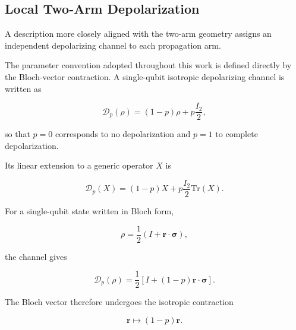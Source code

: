 
\subsection{Local Two-Arm Depolarization}
\label{subsec:local_two_arm_depolarization}

A description more closely aligned with the two-arm geometry assigns an
independent depolarizing channel to each propagation arm.

The parameter convention adopted throughout this work is defined directly by the
Bloch-vector contraction. A single-qubit isotropic depolarizing channel is written as

\begin{equation}
\mathcal{D}_{p}(\rho)
=
(1-p)\rho
+
p\frac{I_2}{2},
\label{eq:single_qubit_depolarizing_density_map}
\end{equation}

so that \(p=0\) corresponds to no depolarization and \(p=1\) to complete
depolarization.

Its linear extension to a generic operator \(X\) is

\begin{equation}
\mathcal{D}_{p}(X)
=
(1-p)X
+
p\frac{I_2}{2}\mathrm{Tr}(X).
\label{eq:single_qubit_depolarizing_operator_map}
\end{equation}

For a single-qubit state written in Bloch form,

\begin{equation}
\rho
=
\frac{1}{2}
\left(
I+\mathbf{r}\cdot\boldsymbol{\sigma}
\right),
\end{equation}

the channel gives

\begin{equation}
\mathcal{D}_p(\rho)
=
\frac{1}{2}
\left[
I+
(1-p)\mathbf{r}\cdot\boldsymbol{\sigma}
\right].
\label{eq:local_depolarizing_bloch_map}
\end{equation}

The Bloch vector therefore undergoes the isotropic contraction

\begin{equation}
\mathbf{r}
\longmapsto
(1-p)\mathbf{r}.
\label{eq:bloch_contraction_local_depolarization}
\end{equation}

